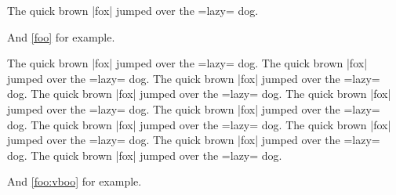 \documentclass[11pt]{article}
\begin{document}
\begin{Code}[glyphs={1:foo}]
The quick brown \code|fox| jumped over the \code=lazy= dog.
\end{Code}

And \ref{foo} for example.

\begin{Code}[glyphs=4,glyphs={1:foo2,2:bar,8:vboo},glyphprefix=foo,glyphprefix=bar]
The quick brown \code|fox| jumped over the \code=lazy= dog.
The quick brown \code|fox| jumped over the \code=lazy= dog.
The quick brown \code|fox| jumped over the \code=lazy= dog.
The quick brown \code|fox| jumped over the \code=lazy= dog.
The quick brown \code|fox| jumped over the \code=lazy= dog.
The quick brown \code|fox| jumped over the \code=lazy= dog.
The quick brown \code|fox| jumped over the \code=lazy= dog.
The quick brown \code|fox| jumped over the \code=lazy= dog.
The quick brown \code|fox| jumped over the \code=lazy= dog.
The quick brown \code|fox| jumped over the \code=lazy= dog.
\end{Code}

And \ref{foo:vboo} for example.
\end{document}
